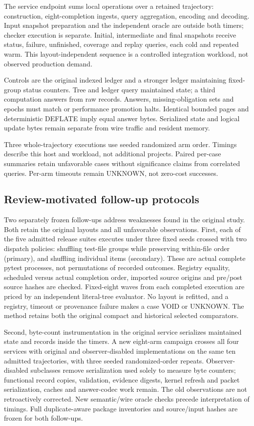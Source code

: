 \documentclass[10pt,journal,compsoc]{IEEEtran}
\theoremstyle{definition}\newtheorem{definition}[theorem]{Definition}
\begin{document}
The service endpoint sums local operations over a retained trajectory:
construction, eight-completion ingests, query aggregation, encoding and
decoding. Input snapshot preparation and the independent oracle are outside
both timers; checker execution is separate. Initial, intermediate and final
snapshots receive status, failure, unfinished, coverage and replay queries,
each cold and repeated warm. This layout-independent sequence is a controlled
integration workload, not observed production demand.

Controls are the original indexed ledger and a stronger ledger maintaining
fixed-group status counters. Tree and ledger query maintained state; a third
computation answers from raw records. Answers, missing-obligation sets and
epochs must match or performance promotion halts. Identical bounded pages
and deterministic DEFLATE imply equal answer bytes. Serialized state and
logical update bytes remain separate from wire traffic and resident memory.

Three whole-trajectory executions use seeded randomized arm order. Timings
describe this host and workload, not additional projects. Paired per-case
summaries retain unfavorable cases without significance claims from correlated
queries. Per-arm timeouts remain $\mathrm{UNKNOWN}$, not zero-cost successes.

\subsection{Review-motivated follow-up protocols}
Two separately frozen follow-ups address weaknesses found in the original
study. Both retain the original layouts and all unfavorable observations.
First, each of the five admitted release suites executes under three fixed
seeds crossed with two dispatch policies: shuffling test-file groups while
preserving within-file order (primary), and shuffling individual items
(secondary). These are actual complete pytest processes, not permutations
of recorded outcomes. Registry equality, scheduled versus actual completion
order, imported source origins and pre/post source hashes are checked.
Fixed-eight waves from each completed execution are priced by an independent
literal-tree evaluator. No layout is refitted, and a registry, timeout or
provenance failure makes a case VOID or UNKNOWN. The method retains both
the original compact and historical selected comparators.

Second, byte-count instrumentation in the original service serializes
maintained state and records inside the timers. A new eight-arm campaign
crosses all four services with original and observer-disabled implementations
on the same ten admitted trajectories, with three seeded randomized-order
repeats. Observer-disabled subclasses remove serialization used solely to
measure byte counters; functional record copies, validation, evidence digests,
kernel refresh and packet serialization, caches and answer-codec work remain.
The old observations are not retroactively corrected. New semantic/wire
oracle checks precede interpretation of timings. Full duplicate-aware
package inventories and source/input hashes are frozen for both follow-ups.
\end{document}
